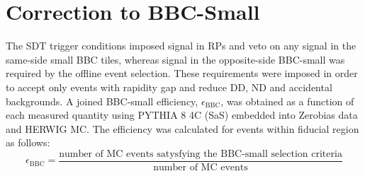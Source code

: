 \section{Correction to BBC-Small }\label{section:star_bbc}
The SDT trigger conditions imposed signal in RPs and veto on any signal in the same-side small BBC tiles, whereas signal in the opposite-side BBC-small was required by the offline event selection. These requirements were imposed in order to accept only events with rapidity gap and reduce \ac{DD}, \ac{ND} and accidental backgrounds.  A joined BBC-small efficiency, $\epsilon_\textrm{BBC}$, was obtained as a function of each measured quantity using  PYTHIA 8 4C (SaS) embedded into Zerobias data and HERWIG \ac{MC}. 
The efficiency was calculated  for events within fiducial region as follows:
\begin{equation}
\epsilon_\textrm{BBC}=\frac{\textrm{number of MC events satysfying the BBC-small selection criteria}}{\textrm{number of MC events}}
\end{equation}


